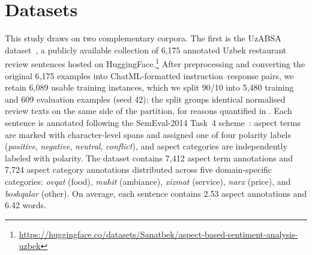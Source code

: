 \documentclass[bdcc,article,submit,moreauthors]{Definitions/mdpi}
\begin{document}


\section{Datasets}
\label{sec:datasets}
This study draws on two complementary corpora. The first is the UzABSA dataset~\cite{matlatipov-etal-2024-uzabsa}, a publicly available collection of 6{,}175 annotated Uzbek restaurant review sentences hosted on HuggingFace.\footnote{\url{https://huggingface.co/datasets/Sanatbek/aspect-based-sentiment-analysis-uzbek}} After preprocessing and converting the original 6{,}175 examples into ChatML-formatted instruction--response pairs, we retain 6{,}089 usable training instances, which we split 90/10 into 5{,}480 training and 609 evaluation examples (seed 42); the split groups identical normalised review texts on the same side of the partition, for reasons quantified in . Each sentence is annotated following the SemEval-2014 Task~4 scheme~\cite{pontiki-etal-2014-semeval}: aspect terms are marked with character-level spans and assigned one of four polarity labels (\textit{positive}, \textit{negative}, \textit{neutral}, \textit{conflict}), and aspect categories are independently labeled with polarity. The dataset contains 7{,}412 aspect term annotations and 7{,}724 aspect category annotations distributed across five domain-specific categories: \textit{ovqat} (food), \textit{muhit} (ambiance), \textit{xizmat} (service), \textit{narx} (price), and \textit{boshqalar} (other). On average, each sentence contains 2.53 aspect annotations and 6.42 words.
\end{document}
